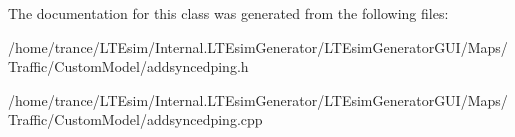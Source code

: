 The documentation for this class was generated from the following files\+:\begin{DoxyCompactItemize}
\item 
/home/trance/\+L\+T\+Esim/\+Internal.\+L\+T\+Esim\+Generator/\+L\+T\+Esim\+Generator\+G\+U\+I/\+Maps/\+Traffic/\+Custom\+Model/addsyncedping.\+h\item 
/home/trance/\+L\+T\+Esim/\+Internal.\+L\+T\+Esim\+Generator/\+L\+T\+Esim\+Generator\+G\+U\+I/\+Maps/\+Traffic/\+Custom\+Model/addsyncedping.\+cpp\end{DoxyCompactItemize}
